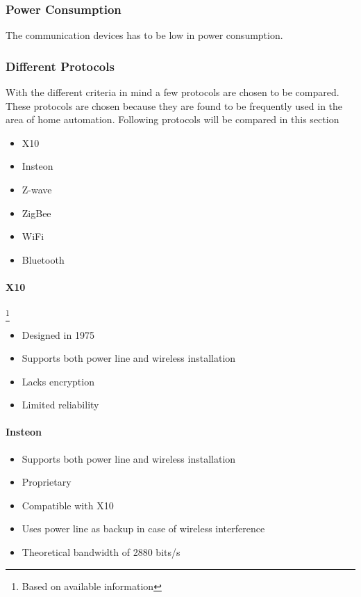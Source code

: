 \subsubsection{Power Consumption}
The communication devices has to be low in power consumption.

\subsubsection{Different Protocols}
With the different criteria in mind a few protocols are chosen to be compared. These protocols are chosen because they are found to be frequently used in the area of home automation.
Following protocols will be compared in this section

\begin{itemize}
\item X10
\item Insteon
\item Z-wave
\item ZigBee
\item WiFi
\item Bluetooth
\end{itemize}


\paragraph{X10}\footnote{Based on available information} \cite{wiki_x10}

\begin{itemize}
\item Designed in 1975
\item Supports both power line and wireless installation
\item Lacks encryption
\item Limited reliability
\end{itemize}


\paragraph{Insteon} \cite{insteon}

\begin{itemize}
\item Supports both power line and wireless installation
\item Proprietary
\item Compatible with X10
\item Uses power line as backup in case of wireless interference
\item Theoretical bandwidth of 2880 bits/s
\end{itemize}


